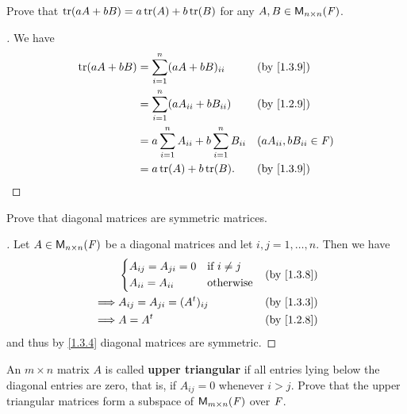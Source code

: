 \begin{ex}\label{ex:1.3.6}
  Prove that \(\tr[aA + bB] = a\tr[A] + b\tr[B]\) for any \(A, B \in \mathsf{M}_{{n} \times n}({\mathit{F}})\).
\end{ex}

\begin{proof}[]
  We have
  \begin{align*}
    \tr[aA + bB] & = \sum_{i = 1}^n (aA + bB)_{i i}                      &  & \text{(by \cref{1.3.9})}    \\
                 & = \sum_{i = 1}^n (aA_{i i} + bB_{i i})                &  & \text{(by \cref{1.2.9})}    \\
                 & = a \sum_{i = 1}^n A_{i i} + b \sum_{i = 1}^n B_{i i} &  & (aA_{i i}, bB_{i i} \in \F) \\
                 & = a\tr[A] + b\tr[B].                                  &  & \text{(by \cref{1.3.9})}
  \end{align*}
\end{proof}

\begin{ex}\label{ex:1.3.7}
  Prove that diagonal matrices are symmetric matrices.
\end{ex}

\begin{proof}[]
  Let \(A \in \mathsf{M}_{{n} \times n}({\mathit{F}})\) be a diagonal matrices and let \(i, j = 1, \dots, n\).
  Then we have
  \begin{align*}
             & \begin{dcases}
      A_{i j} = A_{j i} = 0 & \text{if } i \neq j \\
      A_{i i} = A_{i i}     & \text{otherwise}
    \end{dcases}         &  & \text{(by \cref{1.3.8})} \\
    \implies & A_{i j} = A_{j i} = (\tp{A})_{i j} &  & \text{(by \cref{1.3.3})} \\
    \implies & A = \tp{A}                         &  & \text{(by \cref{1.2.8})}
  \end{align*}
  and thus by \cref{1.3.4} diagonal matrices are symmetric.
\end{proof}

\setcounter{ex}{11}
\begin{ex}\label{ex:1.3.12}
  An \(m \times n\) matrix \(A\) is called \textbf{upper triangular} if all entries lying below the diagonal entries are zero, that is, if \(A_{i j} = 0\) whenever \(i > j\).
  Prove that the upper triangular matrices form a subspace of \(\mathsf{M}_{{m} \times n}({\mathit{F}})\) over \(\mathit{F}\).
\end{ex}

